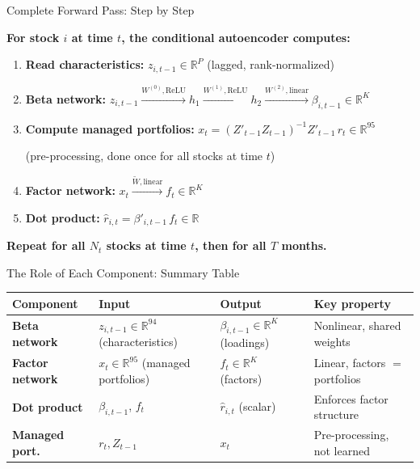 \documentclass[aspectratio=169]{beamer}
\newcommand{\R}{\mathbb{R}}
\begin{document}
\begin{frame}{Complete Forward Pass: Step by Step}

\textbf{For stock $i$ at time $t$, the conditional autoencoder computes:}

\vspace{0.5em}
\begin{enumerate}
    \item \textbf{Read characteristics:} $z_{i,t-1} \in \R^{P}$ (lagged, rank-normalized)
    
    \vspace{0.2em}
    \item \textbf{Beta network:} $z_{i,t-1} \xrightarrow{W^{(0)}, \text{ReLU}} h_1 \xrightarrow{W^{(1)}, \text{ReLU}} h_2 \xrightarrow{W^{(2)}, \text{linear}} \beta_{i,t-1} \in \R^K$
    
    
    \vspace{0.2em}
    \item \textbf{Compute managed portfolios:} $x_t = (Z'_{t-1}Z_{t-1})^{-1}Z'_{t-1}\,r_t \in \R^{95}$
    
    \quad (pre-processing, done once for all stocks at time $t$)
    
    \vspace{0.2em}
    \item \textbf{Factor network:} $x_t \xrightarrow{\tilde{W}, \text{linear}} f_t \in \R^K$
    
    \vspace{0.2em}
    \item \textbf{Dot product:} $\hat{r}_{i,t} = \beta'_{i,t-1}\, f_t \in \R$
\end{enumerate}

\vspace{0.5em}
\textbf{Repeat for all $N_t$ stocks at time $t$, then for all $T$ months.}
\end{frame}
%
%
\begin{frame}{The Role of Each Component: Summary Table}

\begin{center}
\renewcommand{\arraystretch}{1.5}
\begin{tabular}{p{2.8cm} p{3.5cm} p{3.5cm} p{3.0cm}}
\toprule
\textbf{Component} & \textbf{Input} & \textbf{Output} & \textbf{Key property} \\
\midrule
\textcolor{betacolor}{\textbf{Beta network}} & $z_{i,t-1} \in \R^{94}$ (characteristics) & $\beta_{i,t-1} \in \R^K$ (loadings) & Nonlinear, shared weights \\
\textcolor{factorcolor}{\textbf{Factor network}} & $x_t \in \R^{95}$ (managed portfolios) & $f_t \in \R^K$ (factors) & Linear, factors $=$ portfolios \\
\textcolor{dotcolor}{\textbf{Dot product}} & $\beta_{i,t-1}$, $f_t$ & $\hat{r}_{i,t}$ (scalar) & Enforces factor structure \\
\textbf{Managed port.} & $r_t, Z_{t-1}$ & $x_t$ & Pre-processing, not learned \\
\bottomrule
\end{tabular}
\end{center}
\end{frame}
\end{document}
